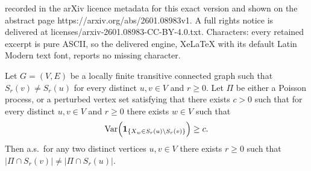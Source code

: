 \documentclass[10pt,a4paper]{amsart}
\begin{document}
recorded in the arXiv licence metadata for this exact version and shown on the abstract page https://arxiv.org/abs/2601.08983v1. A full rights notice is delivered at licenses/arxiv-2601.08983-CC-BY-4.0.txt. Characters: every retained excerpt is pure ASCII, so the delivered engine, XeLaTeX with its default Latin Modern text font, reports no missing character.
\begin{lemma}\label{lem:distinct-point-counts}
    Let $G=(V,E)$ be a locally finite transitive connected graph such that $S_r(v) \neq S_r(u)$ for every distinct $u,v\in V$ and $r\ge 0$.    
    Let $\Pi$ be either a Poisson process, or a perturbed vertex set satisfying that there exists $c>0$ such that for every distinct $u,v\in V$ and $r\ge 0$ there exists $w \in V$ such that 
    \begin{equation} \label{eq:lem:distinct_point_count_condition_on_w}
        \text{\normalfont Var}\Big(\mathbf{1}_{\{X_{w} \in S_r(u) \setminus S_r(v)\}} \Big) \ge c.
    \end{equation}
    Then a.s.\ for any two distinct vertices $u,v\in V$ there exists $r\ge 0$ such that $|\Pi \cap S_r(v)| \neq |\Pi \cap S_r(u)|$.
\end{lemma}
\end{document}
